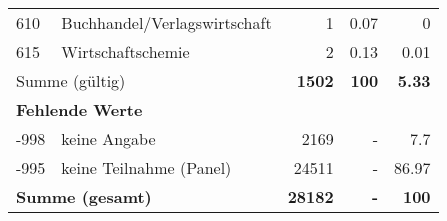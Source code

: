 \begin{longtable}{lXrrr}
        610 & \multicolumn{1}{X}{Buchhandel/Verlagswirtschaft} & %
          \num{1} &
          \num[round-mode=places,round-precision=2]{0.07} &
          \num[round-mode=places,round-precision=2]{0} \\

        615 & \multicolumn{1}{X}{Wirtschaftschemie} & %
          \num{2} &
          \num[round-mode=places,round-precision=2]{0.13} &
          \num[round-mode=places,round-precision=2]{0.01} \\

     \midrule
     \multicolumn{2}{l}{Summe (gültig)} &
       \textbf{\num{1502}} &
     \textbf{100} &
       \textbf{\num[round-mode=places,round-precision=2]{5.33}} \\
     \multicolumn{5}{l}{\textbf{Fehlende Werte}}\\
       -998 &
       keine Angabe &
         \num{2169} &
        - &
         \num[round-mode=places,round-precision=2]{7.7} \\
       -995 &
       keine Teilnahme (Panel) &
         \num{24511} &
        - &
         \num[round-mode=places,round-precision=2]{86.97} \\
     \midrule
     \multicolumn{2}{l}{\textbf{Summe (gesamt)}} &
          \textbf{\num{28182}} &
        \textbf{-} &
        \textbf{100} \\
     \bottomrule
     \end{longtable}
     
